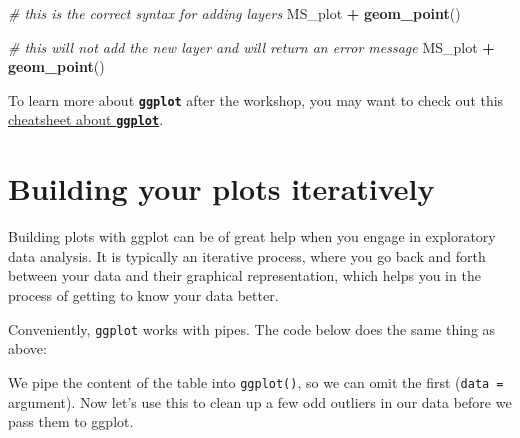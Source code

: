 \documentclass[]{book}
\newenvironment{Shaded}{\begin{snugshade}}{\end{snugshade}}
\newcommand{\CommentTok}[1]{\textcolor[rgb]{0.56,0.35,0.01}{\textit{#1}}}
\newcommand{\DataTypeTok}[1]{\textcolor[rgb]{0.13,0.29,0.53}{#1}}
\newcommand{\FloatTok}[1]{\textcolor[rgb]{0.00,0.00,0.81}{#1}}
\newcommand{\KeywordTok}[1]{\textcolor[rgb]{0.13,0.29,0.53}{\textbf{#1}}}
\newcommand{\NormalTok}[1]{#1}
\newcommand{\OperatorTok}[1]{\textcolor[rgb]{0.81,0.36,0.00}{\textbf{#1}}}
\newcommand{\StringTok}[1]{\textcolor[rgb]{0.31,0.60,0.02}{#1}}
\begin{document}
\begin{Shaded}
\begin{Highlighting}[]
\CommentTok{# this is the correct syntax for adding layers}
\NormalTok{MS_plot }\OperatorTok{+}
\StringTok{  }\KeywordTok{geom_point}\NormalTok{()}

\CommentTok{# this will not add the new layer and will return an error message}
\NormalTok{MS_plot}
  \OperatorTok{+}\StringTok{ }\KeywordTok{geom_point}\NormalTok{()}
\end{Highlighting}
\end{Shaded}

To learn more about \textbf{\texttt{ggplot}} after the workshop, you may want to check out this \href{https://www.rstudio.com/wp-content/uploads/2016/11/ggplot2-cheatsheet-2.1.pdf}{cheatsheet about \textbf{\texttt{ggplot}}}.

\hypertarget{building-your-plots-iteratively}{%
\section{Building your plots iteratively}\label{building-your-plots-iteratively}}

Building plots with ggplot can be of great help when you engage in exploratory data analysis. It is typically an iterative process, where you go back and forth between your data and their graphical representation, which helps you in the process of getting to know your data better.

Conveniently, \texttt{ggplot} works with pipes. The code below does the same thing as above:

\begin{Shaded}
\end{Shaded}

We pipe the content of the table into \texttt{ggplot()}, so we can omit the first (\texttt{data\ =} argument). Now let's use this to clean up a few odd outliers in our data before we pass them to ggplot.

\begin{Shaded}
\end{Shaded}
\end{document}
